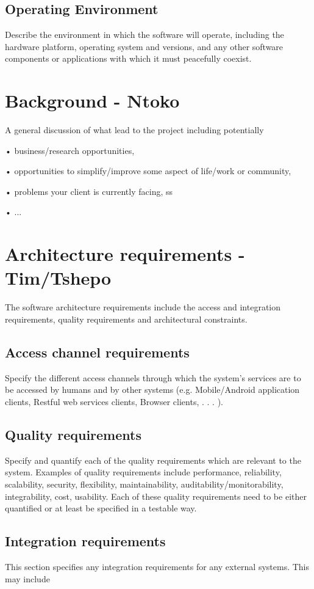 \documentclass{scrreprt}
\begin{document}
\section{Operating Environment}
Describe the environment in which the software will operate, including the 
hardware platform, operating system and versions, and any other software 
components or applications with which it must peacefully coexist.

\chapter{Background - Ntoko}
A general discussion of what lead to the project including potentially

• business/research opportunities,

• opportunities to simplify/improve some aspect of life/work or community, 

• problems your client is currently facing,
ss

• ...

\chapter{Architecture requirements - Tim/Tshepo}

The software architecture requirements include the access and integration requirements, quality requirements and architectural constraints.

\section{Access channel requirements}
Specify the different access channels through which the system’s services are to be accessed by humans and by other systems (e.g. Mobile/Android application clients, Restful web services clients, Browser clients, . . . ).

\section{Quality requirements}
Specify and quantify each of the quality requirements which are relevant to the system. Examples of quality requirements include performance, reliability, scalability, security, flexibility, maintainability, auditability/monitorability, integrability, cost, usability. Each of these quality requirements need to be either quantified or at least be specified in a testable way.

\section{Integration requirements}
This section specifies any integration requirements for any external systems. This may include
\end{document}
